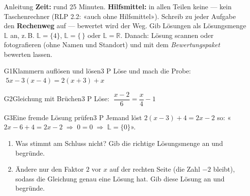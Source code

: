 \documentclass[11pt]{article}
\begin{document}

\begin{lpinfo}{Anleitung}
\textbf{Zeit:} rund 25 Minuten. \textbf{Hilfsmittel:} in allen Teilen keine — kein Taschenrechner (RLP 2.2: «auch ohne Hilfsmittel»).
Schreib zu jeder Aufgabe den \textbf{Rechenweg} auf — bewertet wird der Weg. Gib Lösungen als Lösungsmenge $\mathbb{L}$ an, z.\,B. $\mathbb{L} = \{4\}$, $\mathbb{L} = \{\,\}$ oder $\mathbb{L} = \mathbb{R}$.
Danach: Lösung scannen oder fotografieren (ohne Namen und Standort) und mit dem \emph{Bewertungspaket} bewerten lassen.
\end{lpinfo}


\begin{lpaufgabe}{G1}{Klammern auflösen und lösen}{3 P}
Löse und mach die Probe: $\;5x - 3(x - 4) = 2(x + 3) + x$
\end{lpaufgabe}

\begin{lpaufgabe}{G2}{Gleichung mit Brüchen}{3 P}
Löse: $\;\dfrac{x - 2}{6} = \dfrac{x}{4} - 1$
\end{lpaufgabe}


\begin{lpaufgabe}{G3}{Eine fremde Lösung prüfen}{3 P}
Jemand löst $2(x - 3) + 4 = 2x - 2$ so: «$2x - 6 + 4 = 2x - 2 \;\Rightarrow\; 0 = 0 \;\Rightarrow\; \mathbb{L} = \{0\}$».
\begin{enumerate}[label=(\alph*),leftmargin=*,itemsep=1pt]
\item Was stimmt am Schluss nicht? Gib die richtige Lösungsmenge an und begründe.
\item Ändere nur den Faktor $2$ vor $x$ auf der rechten Seite (die Zahl $-2$ bleibt), sodass die Gleichung genau eine Lösung hat. Gib diese Lösung an und begründe.
\end{enumerate}
\end{lpaufgabe}

\end{document}
